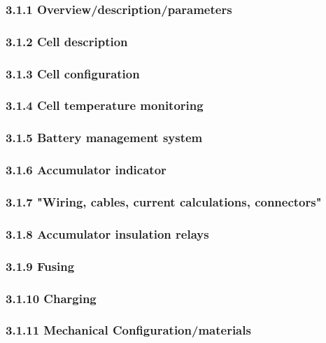 \documentclass{article}
\begin{document}
\subsubsection*{3.1.1 Overview/description/parameters}

\subsubsection*{3.1.2 Cell description}

\subsubsection*{3.1.3 Cell configuration}

\subsubsection*{3.1.4 Cell temperature monitoring}

\subsubsection*{3.1.5 Battery management system}

\subsubsection*{3.1.6 Accumulator indicator}

\subsubsection*{3.1.7 "Wiring, cables, current calculations, connectors"}

\subsubsection*{3.1.8 Accumulator insulation relays}

\subsubsection*{3.1.9 Fusing}

\subsubsection*{3.1.10 Charging}

\subsubsection*{3.1.11 Mechanical Configuration/materials}
\end{document}
